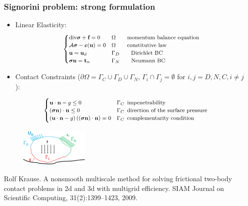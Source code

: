 \documentclass[8pt, oneside]{beamer}   	%
\newcommand{\bff}{\textbf{f}}
\newcommand{\bn}{\textbf{n}}
\newcommand{\bt}{\textbf{t}}
\newcommand{\bu}{\textbf{u}}
\newcommand{\bsigma}{\boldsymbol{\sigma}}
\begin{document}
\begin{frame}

\end{frame}
\begin{frame}

\end{frame}

\begin{frame}

\end{frame}



\begin{frame}
\frametitle{\textbf{Signorini problem: strong formulation}}
\begin{itemize}
\item Linear Elasticity:
\begin{align*}
\footnotesize
\begin{cases}
\text{div} \bsigma + \bff=0 & \Omega  \qquad \text{momentum balance equation}\\
\mathcal{A} \bsigma - \boldsymbol{\varepsilon}(\bu)=0 &\Omega \qquad \text{constitutive law}\\
\bu = \bu_d & \Gamma_D\qquad \text{Dirichlet BC}\\
\bsigma  \bn = \bt_n & \Gamma_N\qquad \text{Neumann BC}\\
\end{cases} \\
\end{align*}
\item Contact Constraints ($ \partial \Omega=\Gamma_C \cup  \Gamma_D \cup  \Gamma_N$, $\Gamma_i \cap  \Gamma_j =\emptyset$ for $i,j=D,N,C, i \neq j$):
\end{itemize}
\begin{align*}
\footnotesize
\begin{cases}
\bu \cdot \bn - g  \leq 0 \quad & \Gamma_C  \:\:  \text{impenetrability}\\
(\bsigma \bn) \cdot \bn \leq 0 \quad & \Gamma_C  \:\:  \text{direction of the surface pressure}\\
 \left(\bu \cdot \bn -g \right) \left( (\bsigma \bn) \cdot \bn \right) =0 &\Gamma_C  \:\:  \text{complementarity condition}
\end{cases}
\end{align*}
\begin{figure}[htbp!]
		\centering
	\includegraphics[width=0.3\textwidth]{img/contactproblem.pdf}
		\label{abb_arc}
\end{figure}
\footnotesize{Rolf Krause. A nonsmooth multiscale method for solving frictional two-body contact problems in 2d and 3d with multigrid efficiency. SIAM Journal on Scientific Computing, 31(2):1399–1423, 2009.}
\end{frame}
\end{document}
